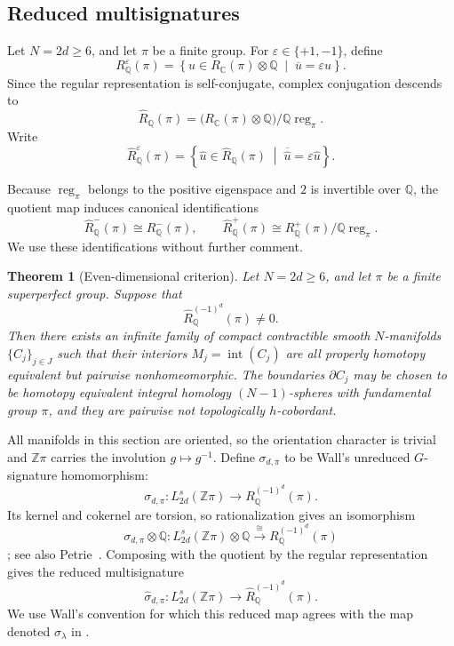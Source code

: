 \documentclass[10pt,reqno]{amsart}
\numberwithin{equation}{section}
\newtheorem{theorem}{Theorem}
\theoremstyle{definition}
\theoremstyle{remark}
\newcommand{\Z}{\mathbb Z}
\newcommand{\Q}{\mathbb Q}
\newcommand{\C}{\mathbb C}
\newcommand{\Int}{\operatorname{int}}
\begin{document}
\subsection{Reduced multisignatures}

Let \(N=2d\geq6\), and let \(\pi\) be a finite group.  For
\(\varepsilon\in\{+1,-1\}\), define
\[
R^\varepsilon_{\Q}(\pi)
=
\left\{
u\in R_{\C}(\pi)\otimes\Q
\;\middle|\;
\overline u=\varepsilon u
\right\}.
\]
Since the regular representation is self-conjugate, complex
conjugation descends to
\[
\widehat R_{\Q}(\pi)
=
\bigl(R_{\C}(\pi)\otimes\Q\bigr)/
\Q\operatorname{reg}_\pi.
\]
Write
\[
\widehat R^\varepsilon_{\Q}(\pi)
=
\left\{
\widehat u\in\widehat R_{\Q}(\pi)
\;\middle|\;
\overline{\widehat u}=\varepsilon\widehat u
\right\}.
\]

Because \(\operatorname{reg}_\pi\) belongs to the positive eigenspace
and \(2\) is invertible over \(\Q\), the quotient map induces canonical
identifications
\[
\widehat R^-_{\Q}(\pi)\cong R^-_{\Q}(\pi),
\qquad
\widehat R^+_{\Q}(\pi)
\cong
R^+_{\Q}(\pi)/\Q\operatorname{reg}_\pi.
\]
We use these identifications without further comment.

\begin{theorem}[Even-dimensional criterion]
\label{thm:general-criterion}
Let \(N=2d\geq6\), and let \(\pi\) be a finite superperfect group.
Suppose that
\[
\widehat R^{(-1)^d}_{\Q}(\pi)\neq0.
\]
Then there exists an infinite family of compact contractible smooth
\(N\)-manifolds \(\{C_j\}_{j\in J}\) such that their interiors
\(M_j=\Int(C_j)\) are all properly homotopy equivalent but pairwise
nonhomeomorphic.  The boundaries \(\partial C_j\) may be chosen to be
homotopy equivalent integral homology \((N-1)\)-spheres with
fundamental group \(\pi\), and they are pairwise not topologically
\(h\)-cobordant.
\end{theorem}

All manifolds in this section are oriented, so the orientation
character is trivial and \(\Z\pi\) carries the involution
\(g\mapsto g^{-1}\).  Define
\(\sigma_{d,\pi}\) to be Wall's unreduced \(G\)-signature
homomorphism:
\[
\sigma_{d,\pi}\colon
L_{2d}^s(\Z\pi)
\longrightarrow
R^{(-1)^d}_{\Q}(\pi).
\]
Its kernel and cokernel are torsion, so rationalization gives an
isomorphism
\[
\sigma_{d,\pi}\otimes\Q\colon
L_{2d}^s(\Z\pi)\otimes\Q
\xrightarrow{\;\cong\;}
R^{(-1)^d}_{\Q}(\pi)
\]
\cite[Theorems~13A.2--13A.4]{Wall}; see also
Petrie~\cite{Petrie}.  Composing with the quotient by the regular
representation gives the reduced multisignature
\[
\widehat\sigma_{d,\pi}\colon
L_{2d}^s(\Z\pi)
\longrightarrow
\widehat R^{(-1)^d}_{\Q}(\pi).
\]
We use Wall's convention for which this reduced map agrees with the
map denoted \(\sigma_\lambda\) in
\cite[Equation~(1.2)]{CrowleyMacko}.
\end{document}
